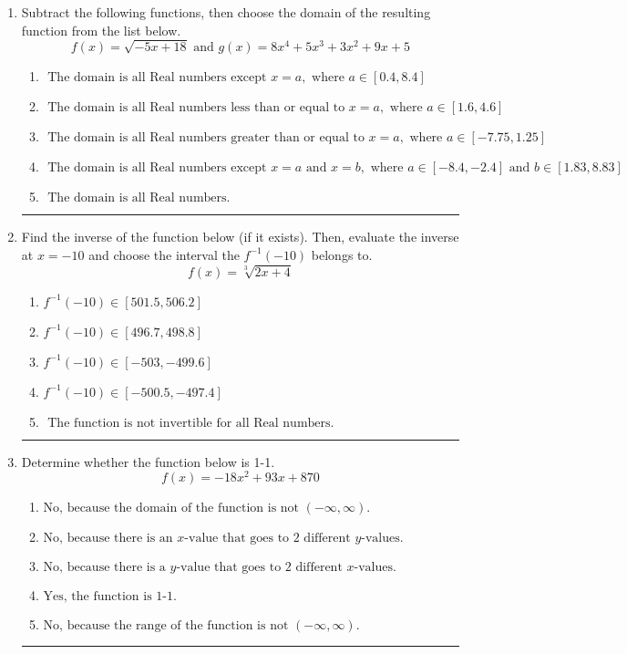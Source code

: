 \documentclass[14pt]{extbook}
\newcommand{\litem}[1]{\item#1\hspace*{-1cm}\rule{\textwidth}{0.4pt}}
\begin{document}
\begin{enumerate}
\litem{
Subtract the following functions, then choose the domain of the resulting function from the list below.\[ f(x) = \sqrt{-5x+18}  \text{ and } g(x) = 8x^{4} +5 x^{3} +3 x^{2} +9 x + 5 \]\begin{enumerate}[label=\Alph*.]
\item \( \text{ The domain is all Real numbers except } x = a, \text{ where } a \in [0.4, 8.4] \)
\item \( \text{ The domain is all Real numbers less than or equal to } x = a, \text{ where } a \in [1.6, 4.6] \)
\item \( \text{ The domain is all Real numbers greater than or equal to } x = a, \text{ where } a \in [-7.75, 1.25] \)
\item \( \text{ The domain is all Real numbers except } x = a \text{ and } x = b, \text{ where } a \in [-8.4, -2.4] \text{ and } b \in [1.83, 8.83] \)
\item \( \text{ The domain is all Real numbers. } \)

\end{enumerate} }
\litem{
Find the inverse of the function below (if it exists). Then, evaluate the inverse at $x = -10$ and choose the interval the $f^{-1}(-10)$ belongs to.\[ f(x) = \sqrt[3]{2 x + 4} \]\begin{enumerate}[label=\Alph*.]
\item \( f^{-1}(-10) \in [501.5, 506.2] \)
\item \( f^{-1}(-10) \in [496.7, 498.8] \)
\item \( f^{-1}(-10) \in [-503, -499.6] \)
\item \( f^{-1}(-10) \in [-500.5, -497.4] \)
\item \( \text{ The function is not invertible for all Real numbers. } \)

\end{enumerate} }
\litem{
Determine whether the function below is 1-1.\[ f(x) = -18 x^2 + 93 x + 870 \]\begin{enumerate}[label=\Alph*.]
\item \( \text{No, because the domain of the function is not $(-\infty, \infty)$.} \)
\item \( \text{No, because there is an $x$-value that goes to 2 different $y$-values.} \)
\item \( \text{No, because there is a $y$-value that goes to 2 different $x$-values.} \)
\item \( \text{Yes, the function is 1-1.} \)
\item \( \text{No, because the range of the function is not $(-\infty, \infty)$.} \)


\end{enumerate}}
\end{enumerate}
\end{document}

